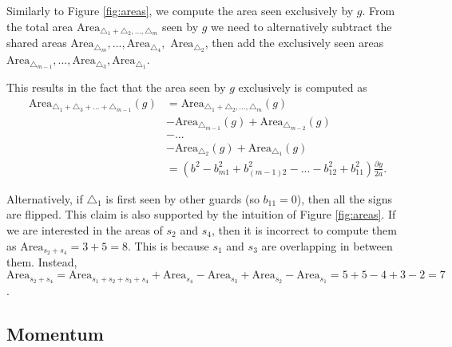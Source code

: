Similarly to Figure \ref{fig:areas}, we  compute the area seen exclusively by $g$. From the total area $\text{Area}_{\triangle_1 + \triangle_2, ..., \triangle_m}$ seen by $g$ we need to alternatively subtract the shared areas $\text{Area}_{\triangle_m}, ..., \text{Area}_{\triangle_4},$ $\text{Area}_{\triangle_2}$, then add the exclusively seen areas $\text{Area}_{\triangle_{m - 1}}, ..., \text{Area}_{\triangle_3}, \text{Area}_{\triangle_1}$.


This results in the fact that the area seen by $g$ exclusively is computed as 
\begin{align*}
    \text{Area}_{\triangle_1 + \triangle_3 + ... + \triangle_{m - 1}}(g) &= \text{Area}_{\triangle_1 + \triangle_2, ..., \triangle_m}(g) \\
    &- \text{Area}_{\triangle_{m - 1}}(g) + \text{Area}_{\triangle_{m - 2}}(g) \\
    &- ... \\
    &- \text{Area}_{\triangle_2}(g) + \text{Area}_{\triangle_1}(g) \\
                                                                      &= \left(b^2 - b_{m1}^2 + b_{(m - 1)2}^2 - ... - b_{12}^2 + b_{11}^2\right)\frac{\partial y}{2a}.
\end{align*}

Alternatively, if $\triangle_1$ is first seen by other guards (so $b_{11} = 0$), then all the signs are flipped. This claim is also supported by the intuition of Figure \ref{fig:areas}. If we are interested in the areas of $s_2$ and $s_4$, then it is incorrect to compute them as $\text{Area}_{s_2 + s_4} = 3 + 5 = 8$. This is because $s_1$ and $s_3$ are overlapping in between them.  Instead, $\text{Area}_{s_2 + s_4} = \text{Area}_{s_1 + s_2 + s_3 + s_4} + \text{Area}_{s_4} - \text{Area}_{s_3} + \text{Area}_{s_2} - \text{Area}_{s_1} = 5 + 5 - 4 + 3 - 2 = 7$.

\subsection{Momentum}
\label{sec:momentum}

